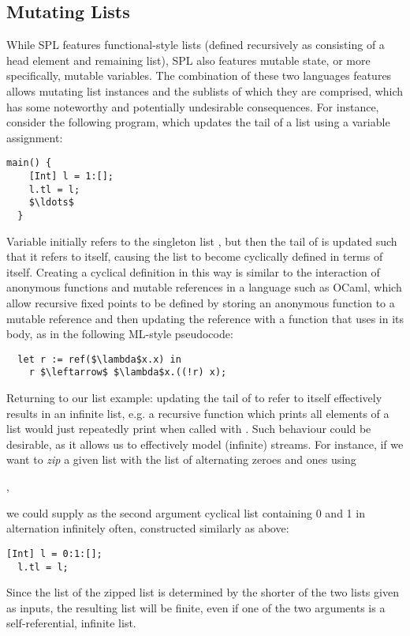 \subsection{Mutating Lists}
While SPL features functional-style lists (defined recursively as consisting of
a head element and remaining list), SPL also features mutable state, or more
specifically, mutable variables.
The combination of these two languages features allows mutating list instances
and the sublists of which they are comprised, which has some noteworthy and
potentially undesirable consequences.
For instance, consider the following program, which updates the tail of a list
using a variable assignment:
%
\begin{lstlisting}[language=spl]
  main() {
    [Int] l = 1:[];
    l.tl = l;
    $\ldots$
  }
\end{lstlisting}

Variable  initially refers to the singleton list , but then the
tail of  is updated such that it refers to  itself, causing the
list to become cyclically defined in terms of itself.
Creating a cyclical definition in this way is similar to the interaction of
anonymous functions and mutable references in a language such as OCaml, which
allow recursive fixed points to be defined by storing an anonymous function to a
mutable reference  and then updating the reference with a function that
uses  in its body, as in the following ML-style pseudocode:
\begin{lstlisting}
  let r := ref($\lambda$x.x) in
    r $\leftarrow$ $\lambda$x.((!r) x);
\end{lstlisting}

Returning to our list example: updating the tail of  to refer to 
itself effectively results in an infinite list, e.g. a recursive function which
prints all elements of a list would just repeatedly print  when called
with .
Such behaviour could be desirable, as it allows us to effectively model
(infinite) streams. For instance, if we want to \emph{zip} a given list with the
list of alternating zeroes and ones using
\begin{center}
  ,
\end{center}
we could supply as the second argument cyclical list containing 0 and 1 in
alternation infinitely often, constructed similarly as above:
\begin{lstlisting}[language=spl]
  [Int] l = 0:1:[];
  l.tl = l;
\end{lstlisting}
%
Since the list of the zipped list is determined by the shorter of the two lists
given as inputs, the resulting list will be finite, even if one of the two
arguments is a self-referential, infinite list.





